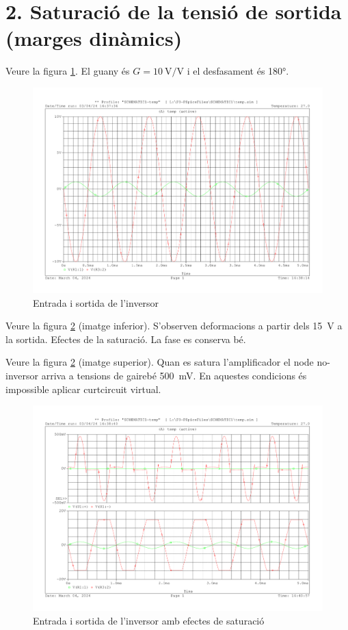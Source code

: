 \documentclass[catalan, a4paper, nobib]{tufte-handout}
\begin{document}
\section{2. Saturació de la tensió de sortida (marges dinàmics)}
 Veure la figura \ref{fig:q4}. El guany és $G=\qty{10}{\volt\per\volt}$ i el desfasament és \ang{180}.
\begin{figure}[h]
    \begin{center}
        \includegraphics[width=\linewidth]{q4.pdf}
    \end{center}
    \caption{Entrada i sortida de l'inversor}
    \label{fig:q4}
\end{figure}

 Veure la figura \ref{fig:q5} (imatge inferior). S'observen deformacions a partir dels \qty{15}{\volt} a la sortida. Efectes de la saturació. La fase es conserva bé.

 Veure la figura \ref{fig:q5} (imatge superior). Quan es satura l'amplificador el node no-inversor arriva a tensions de gairebé \qty{500}{\milli\volt}. En aquestes condicions és impossible aplicar curtcircuit virtual.
\begin{figure}[h]
    \begin{center}
        \includegraphics[width=\linewidth]{q5_2.pdf}
    \end{center}
    \caption{Entrada i sortida de l'inversor amb efectes de saturació}
    \label{fig:q5}
\end{figure}
\end{document}
